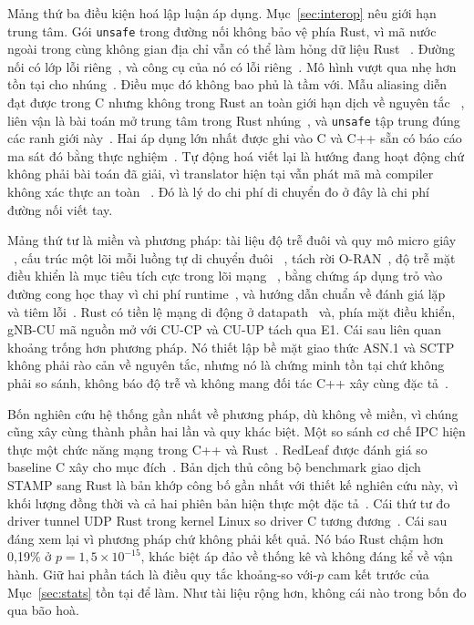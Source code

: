 Mảng thứ ba điều kiện hoá lập luận áp dụng. Mục~\ref{sec:interop} nêu giới hạn
trung tâm. Gói \texttt{unsafe} trong đường nối không bảo vệ phía Rust, vì mã nước ngoài trong
cùng không gian địa chỉ vẫn có thể làm hỏng dữ liệu Rust
~\cite{rivera2021galeed,kirth2022pkrusafe}. Đường nối có lớp lỗi
riêng~\cite{li2022crosslang}, và công cụ của nó có lỗi riêng~\cite{cai2026interop}. Mô hình
vượt qua nhẹ hơn tồn tại cho nhúng~\cite{schuermann2023encapsulated}. Điều mục đó không
bao phủ là tầm với. Mẫu aliasing diễn đạt được trong C nhưng không trong Rust an toàn giới hạn dịch về nguyên tắc
~\cite{emre2023aliasing}, liên vận là bài toán mở trung tâm trong Rust
nhúng~\cite{sharma2024embedded}, và \texttt{unsafe} tập trung đúng các
ranh giới này~\cite{mccormack2026unsafe}. Hai áp dụng lớn nhất được ghi vào C và C++
sẵn có báo cáo ma sát đó bằng thực nghiệm~\cite{li2026rustlinux,fan2026android}.
Tự động hoá viết lại là hướng đang hoạt động chứ không phải bài toán đã giải, vì translator hiện tại vẫn phát mã mà compiler không xác thực an toàn
~\cite{hong2025ctorust}. Đó là lý do chi phí di chuyển đo ở đây là chi phí đường nối viết tay.

Mảng thứ tư là miền và phương pháp: tài liệu độ trễ đuôi và quy mô micro giây
~\cite{dean2013tail,barroso2017microseconds,li2014tales,huang2017predictability},
cấu trúc một lõi mỗi luồng tự di chuyển đuôi
~\cite{enberg2019threadpercore}, tách rời O-RAN~\cite{polese2023oran}, độ trễ mặt điều khiển là mục tiêu tích cực trong lõi mạng
~\cite{liu2023l25gc,park2025ctrlbench}, bằng chứng áp dụng trỏ vào đường cong học thay
vì chi phí runtime~\cite{fulton2021adopting,crichton2024learning,ardito2021verbosity}, và hướng dẫn chuẩn về đánh giá lặp
~\cite{georges2007rigorous} và tiêm
lỗi~\cite{natella2016fault}. Rust có tiền lệ mạng di động ở
datapath~\cite{qazi2017pepc} và, phía mặt điều khiển, gNB-CU mã nguồn mở với CU-CP và CU-UP tách qua E1. Cái sau liên quan khoảng trống hơn phương pháp. Nó thiết lập
bề mặt giao thức ASN.1 và SCTP không phải rào cản về nguyên tắc, nhưng nó là chứng minh tồn tại
chứ không phải so sánh, không báo độ trễ và không mang đối tác C++ xây cùng
đặc tả~\cite{alsoran}.

Bốn nghiên cứu hệ thống gần nhất về phương pháp, dù không về miền, vì chúng cũng xây
cùng thành phần hai lần và quy khác biệt. Một so sánh cơ chế IPC hiện thực một
chức năng mạng trong C++ và Rust~\cite{li2021ipc}. RedLeaf được đánh giá so baseline C
xây cho mục đích~\cite{narayanan2020redleaf}. Bản dịch thủ công bộ benchmark giao dịch STAMP
sang Rust là bản khớp công bố gần nhất với thiết kế nghiên cứu này,
vì khối lượng đồng thời và cả hai phiên bản hiện thực một
đặc tả~\cite{suchert2023stamp}. Cái thứ tư đo driver tunnel UDP Rust trong
kernel Linux so driver C tương đương~\cite{gonzalez2023rustudp}. Cái sau đáng xem lại vì phương pháp chứ không phải kết quả. Nó báo Rust chậm hơn 0,19\% ở
$p = 1{,}5 \times 10^{-15}$, khác biệt áp đảo về thống kê và không đáng kể về
vận hành. Giữ hai phần tách là điều quy tắc khoảng-so với-$p$ cam kết trước của
Mục~\ref{sec:stats} tồn tại để làm. Như tài liệu rộng hơn, không cái nào trong bốn đo qua
bão hoà.

